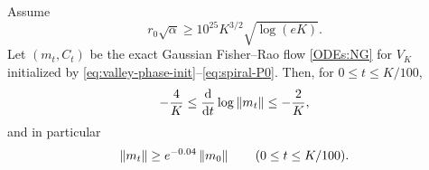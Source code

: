 \begin{lemma}\label{lem:spiral-shadow}
    Assume
    \begin{equation}\label{eq:r0-shadowing}
        r_0\sqrt\alpha\geq10^{25}K^{3/2}\sqrt{\log(eK)} .
    \end{equation}
    Let $(m_t,C_t)$ be the exact Gaussian Fisher--Rao flow \eqref{ODEs:NG} for $V_K$
    initialized by \eqref{eq:valley-phase-init}--\eqref{eq:spiral-P0}. Then, for
    $0\leq t\leq K/100$,
    \begin{equation}\label{eq:radial-shadowing}
        -\frac4K\leq\frac{\mathrm{d}}{\mathrm{d} t}\log\left\lVert m_t\right\rVert\leq-\frac2K,
    \end{equation}
    and in particular
    \begin{equation}\label{eq:mean-lower-shadowing}
        \left\lVert m_t\right\rVert\geq e^{-0.04}\left\lVert m_0\right\rVert
        \qquad(0\leq t\leq K/100).
    \end{equation}
\end{lemma}

